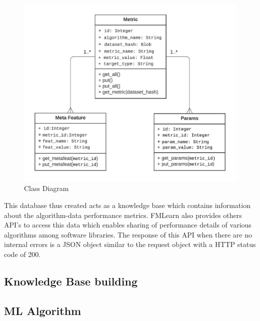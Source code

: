 \begin{figure}[t]
    \centering
    \includegraphics[width=15cm]{images/Class Diagram.jpeg}
    \caption{Class Diagram}
    \label{class-diagram}
\end{figure}

This database thus created acts as a knowledge base which contains information about the algorithm-data performance metrics. FMLearn also provides others API's to access this data which enables sharing of performance details of various algorithms among software libraries. The response of this API when there are no internal errors is a JSON object similar to the request object with a HTTP status code of 200.




\subsection{Knowledge Base building}
\label{knowledge-base}

\subsection{ML Algorithm}
